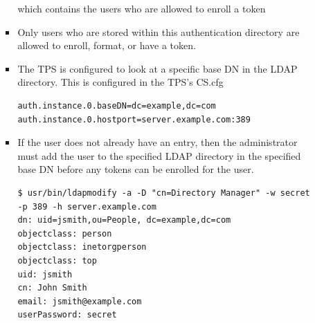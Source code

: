 \documentclass[a4paper]{article}
\begin{document}
\begin{itemize}
\begin{itemize}
\begin{itemize}
                            which contains the users who are allowed to enroll a token
                        \item Only users who are stored within this authentication directory are allowed to enroll,
                             format, or have a token.
                        \item The TPS is configured to look at a specific base DN in the LDAP directory. This is configured in the TPS's CS.cfg
                            \begin{lstlisting}[style=configFile]
auth.instance.0.baseDN=dc=example,dc=com
auth.instance.0.hostport=server.example.com:389
                            \end{lstlisting}
                        \item  If the user does not already have an entry, then the administrator must add the user to the
                            specified LDAP directory in the specified base DN before any tokens can be enrolled for the user.
                            \begin{lstlisting}[style=bashInputStyle]
$ usr/bin/ldapmodify -a -D "cn=Directory Manager" -w secret -p 389 -h server.example.com
dn: uid=jsmith,ou=People, dc=example,dc=com
objectclass: person
objectclass: inetorgperson
objectclass: top
uid: jsmith
cn: John Smith
email: jsmith@example.com
userPassword: secret
                            \end{lstlisting}
                     \end{itemize}
            \end{itemize}
    \end{itemize}    
\end{document}
